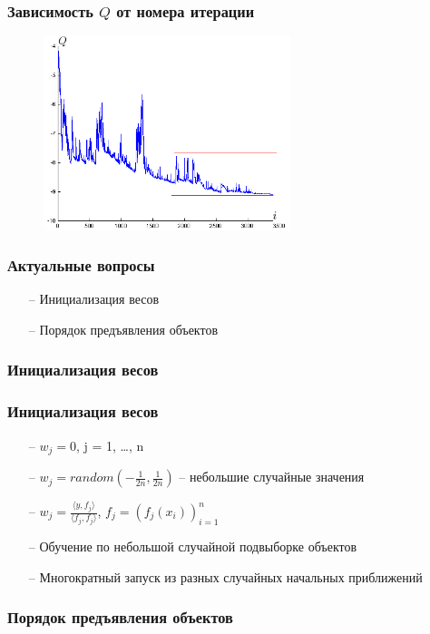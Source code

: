 \documentclass[12pt]{beamer}
\begin{document}
\begin{frame}\frametitle{Зависимость $Q$ от номера итерации}
\begin{figure}[htbp]
  \includegraphics[height=160pt, keepaspectratio = true]{images/stochastic_gradient1}   
\end{figure}
\end{frame}

\begin{frame}\frametitle{Актуальные вопросы}
\begin{itemize}
\item[--] Инициализация весов
\item[--] Порядок предъявления объектов
\end{itemize}
\end{frame}

\begin{frame}\frametitle{Инициализация весов}

\end{frame}

\begin{frame}\frametitle{Инициализация весов}
\begin{itemize}
\item[--] $w_j = 0$, j = 1, \dots, n
\item[--] $w_j = random(-\frac{1}{2n}, \frac{1}{2n})$ -- небольшие случайные значения
\item[--] $w_j = \frac{\langle y, f_j \rangle}{\langle f_j, f_j \rangle}$, $f_j = (f_j(x_i))_{i = 1}^n$
\item[--] Обучение по небольшой случайной подвыборке объектов
\item[--] Многократный запуск из разных случайных начальных приближений
\end{itemize}

\end{frame}

\begin{frame}\frametitle{Порядок предъявления объектов}

\end{frame}
\end{document}
